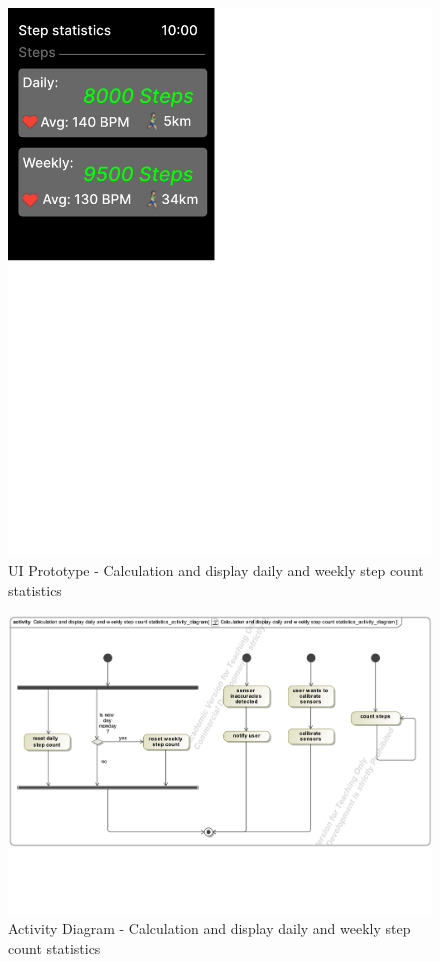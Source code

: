 \documentclass{article}
\begin{document}
		\clearpage
		\begin{figure}[h!]
			\centering
			\captionsetup{labelformat=empty}
			\caption{UI Prototype - Calculation and display daily and weekly step count statistics}
		    	\includegraphics[scale=1.6, angle=0]{Marc/UIPrototype/steps.pdf}
		\end{figure}
		\clearpage
		\begin{figure}[h!]
			\centering
		    	\captionsetup{labelformat=empty}
		    	\caption{Activity Diagram - Calculation and display daily and weekly step count statistics}
		    	\includegraphics[width=\textwidth, angle=0]{Marc/step/StepCountActivity.pdf}
		\end{figure}
\end{document}
